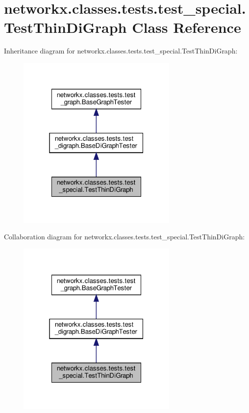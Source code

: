 \hypertarget{classnetworkx_1_1classes_1_1tests_1_1test__special_1_1TestThinDiGraph}{}\section{networkx.\+classes.\+tests.\+test\+\_\+special.\+Test\+Thin\+Di\+Graph Class Reference}
\label{classnetworkx_1_1classes_1_1tests_1_1test__special_1_1TestThinDiGraph}


Inheritance diagram for networkx.\+classes.\+tests.\+test\+\_\+special.\+Test\+Thin\+Di\+Graph\+:
\nopagebreak
\begin{figure}[H]
\begin{center}
\leavevmode
\includegraphics[width=223pt]{classnetworkx_1_1classes_1_1tests_1_1test__special_1_1TestThinDiGraph__inherit__graph}
\end{center}
\end{figure}


Collaboration diagram for networkx.\+classes.\+tests.\+test\+\_\+special.\+Test\+Thin\+Di\+Graph\+:
\nopagebreak
\begin{figure}[H]
\begin{center}
\leavevmode
\includegraphics[width=223pt]{classnetworkx_1_1classes_1_1tests_1_1test__special_1_1TestThinDiGraph__coll__graph}
\end{center}
\end{figure}
